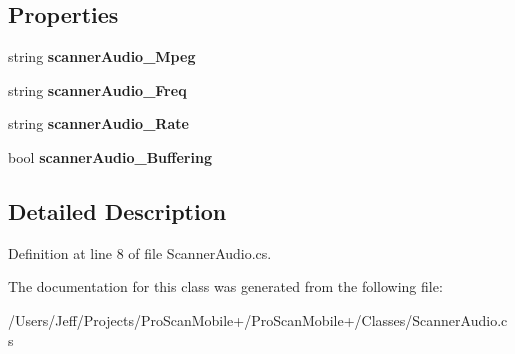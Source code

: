 \subsection*{Properties}
\begin{DoxyCompactItemize}
\item 
\hypertarget{class_pro_scan_mobile_1_1_scanner_audio_af9084593f78d2df56b8e5053c9588146}{string {\bfseries scanner\-Audio\-\_\-\-Mpeg}}\label{class_pro_scan_mobile_1_1_scanner_audio_af9084593f78d2df56b8e5053c9588146}

\item 
\hypertarget{class_pro_scan_mobile_1_1_scanner_audio_a082206408783224924ce41f41bbaa0b1}{string {\bfseries scanner\-Audio\-\_\-\-Freq}}\label{class_pro_scan_mobile_1_1_scanner_audio_a082206408783224924ce41f41bbaa0b1}

\item 
\hypertarget{class_pro_scan_mobile_1_1_scanner_audio_a3f4c416df6ce416ee528980324f72929}{string {\bfseries scanner\-Audio\-\_\-\-Rate}}\label{class_pro_scan_mobile_1_1_scanner_audio_a3f4c416df6ce416ee528980324f72929}

\item 
\hypertarget{class_pro_scan_mobile_1_1_scanner_audio_a0cdaf7cbb44b2b7270cdcc2a7024ba47}{bool {\bfseries scanner\-Audio\-\_\-\-Buffering}}\label{class_pro_scan_mobile_1_1_scanner_audio_a0cdaf7cbb44b2b7270cdcc2a7024ba47}

\end{DoxyCompactItemize}


\subsection{Detailed Description}


Definition at line 8 of file Scanner\-Audio.\-cs.



The documentation for this class was generated from the following file\-:\begin{DoxyCompactItemize}
\item 
/\-Users/\-Jeff/\-Projects/\-Pro\-Scan\-Mobile+/\-Pro\-Scan\-Mobile+/\-Classes/Scanner\-Audio.\-cs\end{DoxyCompactItemize}
